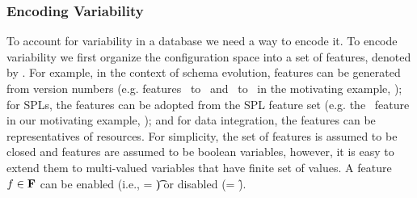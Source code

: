 \subsubsection{Encoding Variability}
\label{sec:encode-var}


To account for variability in a database we need a way to 
encode it.
%
%
To encode variability we first organize the configuration space into
a set of features, denoted by \fSet.
%
%
For example, in the context of schema evolution, features can be generated from version 
numbers (e.g. features \vOne\ to \vFive\ and \tOne\ to \tFive\ in the 
motivating example, ); for SPLs, 
the features can be adopted from the SPL feature set (e.g. the \edu\ feature in
our motivating example, ); and 
for data integration, the features can be representatives of resources.  
For simplicity, the set of features is assumed to be closed and features are
assumed to be boolean variables, however, it is easy to extend them
to multi-valued variables that have finite set of values.
A feature \ensuremath{\fName \in \fSet} can be enabled (i.e., \fName = \t) or disabled (\fName = \f).


